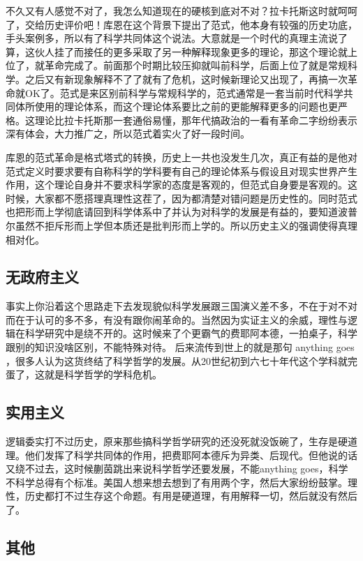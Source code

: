 \documentclass[]{book}
\begin{document}
不久又有人感觉不对了，我怎么知道现在的硬核到底对不对？拉卡托斯这时就呵呵了，交给历史评价吧！库恩在这个背景下提出了范式，他本身有较强的历史功底，手头案例多，所以有了科学共同体这个说法。大意就是一个时代的真理主流说了算，这伙人挂了而接任的更多采取了另一种解释现象更多的理论，那这个理论就上位了，就革命完成了。前面那个时期比较压抑就叫前科学，后面上位了就是常规科学。之后又有新现象解释不了了就有了危机，这时候新理论又出现了，再搞一次革命就OK了。范式是来区别前科学与常规科学的，范式通常是一套当前时代科学共同体所使用的理论体系，而这个理论体系要比之前的更能解释更多的问题也更严格。这理论比拉卡托斯那一套通俗易懂，那年代搞政治的一看有革命二字纷纷表示深有体会，大力推广之，所以范式着实火了好一段时间。

库恩的范式革命是格式塔式的转换，历史上一共也没发生几次，真正有益的是他对范式定义时要求要有自称科学的学科要有自己的理论体系与假设且对现实世界产生作用，这个理论自身并不要求科学家的态度是客观的，但范式自身要是客观的。这时候，大家都不愿搭理真理性这茬了，因为都清楚对错问题是历史性的。同时范式也把形而上学彻底请回到科学体系中了并认为对科学的发展是有益的，要知道波普尔虽然不拒斥形而上学但本质还是批判形而上学的。所以历史主义的强调使得真理相对化。

\subsection{无政府主义}

事实上你沿着这个思路走下去发现貌似科学发展跟三国演义差不多，不在于对不对而在于认可的多不多，有没有跟你闹革命的。当然因为实证主义的余威，理性与逻辑在科学研究中是绕不开的。这时候来了个更霸气的费耶阿本德，一拍桌子，科学跟别的知识没啥区别，不能特殊对待。
后来流传到世上的就是那句 anything goes
，很多人认为这货终结了科学哲学的发展。从20世纪初到六七十年代这个学科就完蛋了，这就是科学哲学的学科危机。

\subsection{实用主义}

逻辑委实打不过历史，原来那些搞科学哲学研究的还没死就没饭碗了，生存是硬道理。他们发挥了科学共同体的作用，把费耶阿本德斥为异类、后现代。但他说的话又绕不过去，这时候蒯茵跳出来说科学哲学还要发展，不能anything
goes，科学不科学总得有个标准。美国人想来想去想到了有用两个字，然后大家纷纷鼓掌。理性，历史都打不过生存这个命题。有用是硬道理，有用解释一切，然后就没有然后了。

\subsection{其他}
\end{document}
